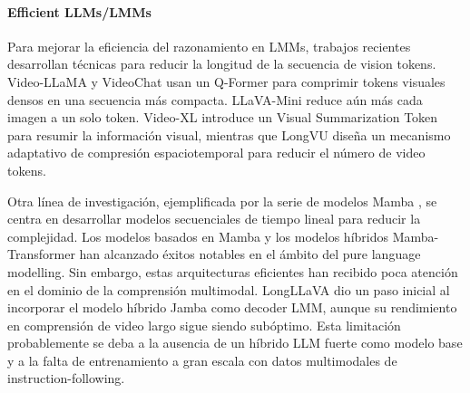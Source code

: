 \vspace{-1em}
\paragraph{Efficient LLMs/LMMs}
Para mejorar la eficiencia del razonamiento en LMMs, trabajos recientes \cite{li2023videochat, zhang-etal-2023-video, li2024mvbench, li2023blip, zhang2025llava, shu2024video, shen2024longvu} desarrollan técnicas para reducir la longitud de la secuencia de vision tokens. Video-LLaMA \cite{zhang-etal-2023-video} y VideoChat \cite{li2023videochat, li2024mvbench} usan un Q-Former \cite{li2023blip} para comprimir tokens visuales densos en una secuencia más compacta. LLaVA-Mini \cite{zhang2025llava} reduce aún más cada imagen a un solo token. Video-XL \cite{shu2024video} introduce un Visual Summarization Token para resumir la información visual, mientras que LongVU \cite{shen2024longvu} diseña un mecanismo adaptativo de compresión espaciotemporal para reducir el número de video tokens.

Otra línea de investigación, ejemplificada por la serie de modelos Mamba \cite{gu2023mamba, dao2024transformers}, se centra en desarrollar modelos secuenciales de tiempo lineal para reducir la complejidad. Los modelos basados en Mamba \cite{zuo2024falcon} y los modelos híbridos Mamba-Transformer \cite{lieber2024jamba, glorioso2024zamba} han alcanzado éxitos notables en el ámbito del pure language modelling. Sin embargo, estas arquitecturas eficientes han recibido poca atención en el dominio de la comprensión multimodal. LongLLaVA \cite{wang2024longllava} dio un paso inicial al incorporar el modelo híbrido Jamba \cite{lieber2024jamba} como decoder LMM, aunque su rendimiento en comprensión de video largo sigue siendo subóptimo. Esta limitación probablemente se deba a la ausencia de un híbrido LLM fuerte como modelo base y a la falta de entrenamiento a gran escala con datos multimodales de instruction-following.
